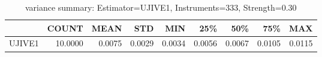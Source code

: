 \begin{table}[ht]
\centering
\caption{variance summary: Estimator=UJIVE1, Instruments=333, Strength=0.30}
\begin{tabular}{lrrrrrrrr}
\toprule
 & COUNT & MEAN & STD & MIN & 25\% & 50\% & 75\% & MAX \\
\midrule
UJIVE1 & 10.0000 & 0.0075 & 0.0029 & 0.0034 & 0.0056 & 0.0067 & 0.0105 & 0.0115 \\
\bottomrule
\end{tabular}
\end{table}
